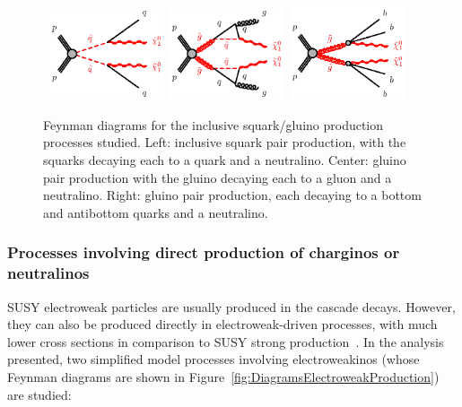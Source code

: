 \begin{figure}[!ht]
\begin{center}
\mbox{
\includegraphics[width=0.3\textwidth]{BeyondSM/Figures/sqsq-qqN1N1.eps}
\includegraphics[width=0.3\textwidth]{BeyondSM/Figures/gogo-ggN1N1.eps}
\includegraphics[width=0.3\textwidth]{BeyondSM/Figures/gogo-bbbbN1N1.eps}
}
\end{center}
\caption[Feynman diagrams for different inclusive squark/gluino production processes.]{Feynman diagrams for the inclusive squark/gluino production processes studied. Left: inclusive squark pair production, with the squarks decaying each to a quark and a neutralino. Center: gluino pair production with the gluino decaying each to a gluon and a neutralino. Right: gluino pair production, each decaying to a bottom and antibottom quarks and a neutralino.}
\label{fig:DiagramsInclusiveProduction}
\end{figure}


\subsubsection{Processes involving direct production of charginos or neutralinos}

SUSY electroweak particles are usually produced in the cascade decays.
However, they can also be produced directly in electroweak-driven processes, with much lower cross sections in comparison to SUSY strong production~\cite{Kramer:2012bx, Berggren:2013bua}.
In the analysis presented, two simplified model processes involving electroweakinos (whose Feynman diagrams are shown in Figure~\ref{fig:DiagramsElectroweakProduction}) are studied:

